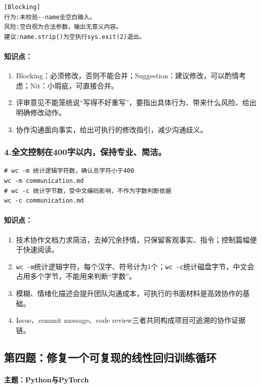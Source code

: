 \documentclass{article}
\begin{document}
\begin{lstlisting}
[Blocking]
行为:未校验--name全空白输入。
风险:空白视为合法参数，输出无意义内容。
建议:name.strip()为空执行sys.exit(2)退出。
\end{lstlisting}
\paragraph{知识点：}
\begin{enumerate}
\item Blocking：必须修改，否则不能合并；Suggestion：建议修改，可以酌情考虑；Nit：小瑕疵，可直接合并。
\item 评审意见不能笼统说“写得不好重写”，要指出具体行为、带来什么风险、给出明确修改动作。
\item 协作沟通面向事实，给出可执行的修改指引，减少沟通歧义。
\end{enumerate}

\subsubsection*{4.全文控制在400字以内，保持专业、简洁。}

\begin{lstlisting}
# wc -m 统计逻辑字符数，确认总字符小于400
wc -m communication.md
# wc -c 统计字节数，受中文编码影响，不作为字数判断依据
wc -c communication.md
\end{lstlisting}
\paragraph{知识点：}
\begin{enumerate}
\item 技术协作文档力求简洁，去掉冗余抒情，只保留客观事实、指令；控制篇幅便于快速阅读。
\item \texttt{wc -m}统计逻辑字符，每个汉字、符号计为1个；\texttt{wc -c}统计磁盘字节，中文会占用多个字节，不能用来判断“字数”。
\item 模糊、情绪化描述会提升团队沟通成本，可执行的书面材料是高效协作的基础。
\item Issue、commit message、code review三者共同构成项目可追溯的协作证据链。
\end{enumerate}

\subsection*{第四题：修复一个可复现的线性回归训练循环}
\paragraph{主题：Python与PyTorch}
\end{document}
